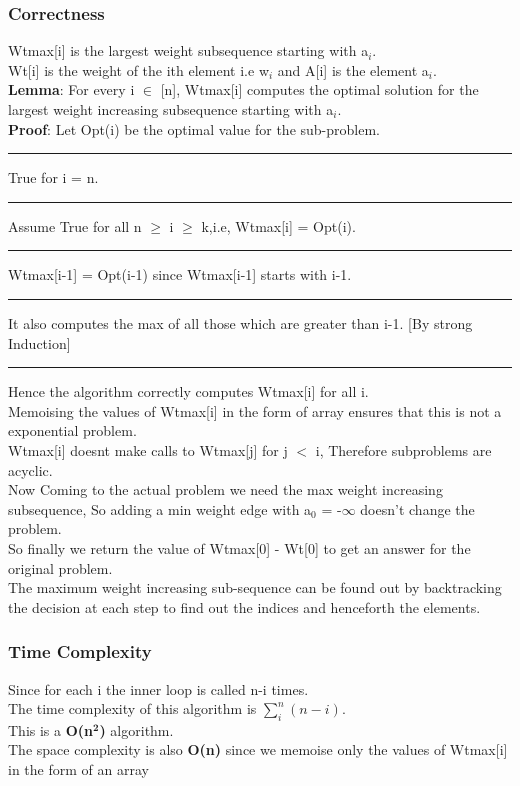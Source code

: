 \documentclass{report}
\begin{document}
 \subsubsection*{Correctness}
 Wtmax[i] is the largest weight subsequence starting with a$_i$.\\
 Wt[i] is the weight of the ith element i.e w$_i$ and A[i] is the element a$_i$.\\
 \textbf{Lemma}: For every i $\in$ [n], Wtmax[i] computes the optimal solution for the largest weight increasing subsequence starting with a$_i$.\\
 \textbf{Proof}: Let Opt(i) be the optimal value for the sub-problem.\\
 \rule[0mm]{1cm}{0pt} True for i = n.\\
 \rule[0mm]{1cm}{0pt} Assume True for all n $\geq$ i $\geq$ k,i.e, Wtmax[i] = Opt(i).\\
 \rule[0mm]{1cm}{0pt} Wtmax[i-1] = Opt(i-1) since Wtmax[i-1] starts with i-1.\\
 \rule[0mm]{1cm}{0pt} It also computes the max of all those which are greater than i-1. [By strong Induction]\\
 \rule[0mm]{1cm}{0pt} Hence the algorithm correctly computes Wtmax[i] for all i.\\
 Memoising the values of Wtmax[i] in the form of array ensures that this is not a exponential problem.\\
 Wtmax[i] doesnt make calls to Wtmax[j] for j $<$ i, Therefore subproblems are acyclic.\\
 Now Coming to the actual problem we need the max weight increasing subsequence, So adding a min weight edge with a$_0$ = -$\infty$ doesn't change the problem.\\
 So finally we return the value of Wtmax[0] - Wt[0] to get an answer for the original problem.\\
 The maximum weight increasing sub-sequence can be found out by backtracking the decision at each step to find out the indices and henceforth the elements.\\
 \subsubsection*{Time Complexity}
 Since for each i the inner loop is called n-i times.\\
 The time complexity of this algorithm is $\sum_i^n (n-i)$.\\
 This is a \textbf{O(n$^\mathbf{2}$)} algorithm.\\
 The space complexity is also \textbf{O(n)} since we memoise only the values of Wtmax[i] in the form of an array
\end{document}
